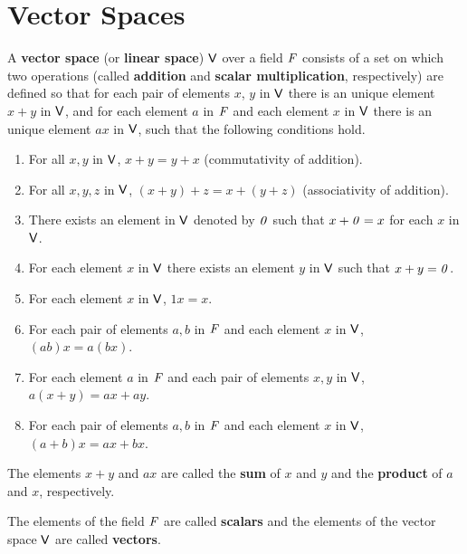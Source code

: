 \section{Vector Spaces}\label{sec:1.2}

\begin{defn}\label{1.2.1}
  A \textbf{vector space} (or \textbf{linear space}) \(\mathsf{V}\) over a field \(\mathit{F}\) consists of a set on which two operations (called \textbf{addition} and \textbf{scalar multiplication}, respectively) are defined so that for each pair of elements \(x\), \(y\) in \(\mathsf{V}\) there is an unique element \(x + y\) in \(\mathsf{V}\), and for each element \(a\) in \(\mathit{F}\) and each element \(x\) in \(\mathsf{V}\) there is an unique element \(ax\) in \(\mathsf{V}\), such that the following conditions hold.
  \begin{enumerate}[label=(VS \arabic*), ref=VS \arabic*]
    \item\label{vs1}
    For all \(x, y\) in \(\mathsf{V}\), \(x + y = y + x\)
    (commutativity of addition).
    \item\label{vs2}
    For all \(x, y, z\) in \(\mathsf{V}\), \((x + y) + z = x + (y + z)\)
    (associativity of addition).
    \item\label{vs3}
    There exists an element in \(\mathsf{V}\) denoted by \(\mathit{0}\) such that \(x + \mathit{0} = x\) for each \(x\) in \(\mathsf{V}\).
    \item\label{vs4}
    For each element \(x\) in \(\mathsf{V}\) there exists an element \(y\) in \(\mathsf{V}\) such that \(x + y = \mathit{0}\).
    \item\label{vs5}
    For each element \(x\) in \(\mathsf{V}\), \(1x = x\).
    \item\label{vs6}
    For each pair of elements \(a, b\) in \(\mathit{F}\) and each element \(x\) in \(\mathsf{V}\), \((ab) x = a (bx)\).
    \item\label{vs7}
    For each element \(a\) in \(\mathit{F}\) and each pair of elements \(x, y\) in \(\mathsf{V}\), \(a (x + y) = ax + ay\).
    \item\label{vs8}
    For each pair of elements \(a, b\) in \(\mathit{F}\) and each element \(x\) in \(\mathsf{V}\), \((a + b) x = ax + bx\).
  \end{enumerate}
  The elements \(x + y\) and \(ax\) are called the \textbf{sum} of \(x\) and \(y\) and the \textbf{product} of \(a\) and \(x\), respectively.
\end{defn}

\begin{defn}\label{1.2.2}
  The elements of the field \(\mathit{F}\) are called \textbf{scalars} and the elements of the vector space \(\mathsf{V}\) are called \textbf{vectors}.
\end{defn}

